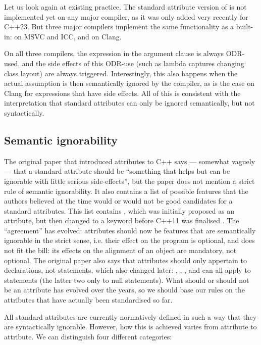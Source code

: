 Let us look again at existing practice. The standard attribute version of  is not implemented yet on any major compiler, as it was only added very recently for C++23. But three major compilers implement the same functionality as a built-in:  on MSVC and ICC, and \mbox{} on Clang.

On all three compilers, the expression in the argument clause is always ODR-used, and the side effects of this ODR-use (such as lambda captures changing class layout) are always triggered. Interestingly, this also happens when the actual assumption is then semantically ignored by the compiler, as is the case on Clang for expressions that have side effects. All of this is consistent with the interpretation that standard attributes can only be ignored semantically, but not syntactically.

\subsection{Semantic ignorability}
\label{subsec:semantic}

The original paper that introduced attributes to C++ \cite{N2761} says --- somewhat vaguely --- that a standard attribute should be  ``something that helps but can be ignorable with little serious side-effects'', but the paper does not mention a strict rule of semantic ignorability. It also contains a list of possible features that the authors believed at the time would or would not be good candidates for a standard attributes. This list contains , which was initially proposed as an attribute, but then changed to a keyword before C++11 was finalised \cite{N3190}. The ``agreement'' has evolved: attributes should now be features that are semantically ignorable in the strict sense, i.e. their effect on the program is optional, and  does not fit the bill: its effects on the alignment of an object are mandatory, not optional. The original paper also says that attributes should only appertain to declarations, not statements, which also changed later: , , , and  can all apply to statements (the latter two only to null statements). What should or should not be an attribute has evolved over the years, so we should base our rules on the attributes that have actually been standardised so far.

All standard attributes are currently normatively defined in such a way that they are syntactically ignorable. However, how this is achieved varies from attribute to attribute. We can distinguish four different categories:

